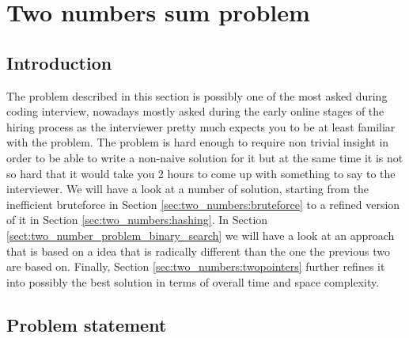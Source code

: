 %


\chapter{Two numbers sum problem}
\label{ch:two_numbers_sum}
\section*{Introduction}
The problem described in this section is possibly one of the most asked during coding interview, nowadays mostly 
asked during the early online stages of the hiring process as the interviewer pretty much expects you to be at least familiar with the problem.
The problem is hard enough to require non trivial insight in order to be able to write a non-naive solution for it but at the same time it is not so hard that it would take you 2 hours to come up with something to say to the interviewer.
We will have a look at a number of solution, starting from the inefficient bruteforce in Section \ref{sec:two_numbers:bruteforce} to a refined version of it in Section \ref{sec:two_numbers:hashing}.
In Section \ref{sect:two_number_problem_binary_search} we will have a look at an approach that is based on a idea that is radically different than the one the previous two are based on.
Finally, Section \ref{sec:two_numbers:twopointers} further refines it into  possibly the best solution in terms of overall time and space complexity.

\section{Problem statement}

